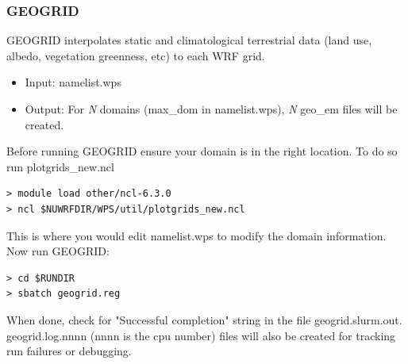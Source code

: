 \begin{frame}[fragile]\frametitle{GEOGRID}

\scriptsize{
GEOGRID interpolates static and climatological terrestrial data (land use, albedo, vegetation greenness, etc) to each WRF grid.
\begin{itemize}
\item Input: namelist.wps
\item Output: For \emph{N} domains (max\_dom in namelist.wps), \emph{N} geo\_em files will be created.
\end{itemize}\scriptsize}    
\hrulefill\par
\scriptsize{Before running GEOGRID ensure your domain is in the right location. To do so run plotgrids\_new.ncl}
\verbatimfont{\scriptsize}%
\begin{verbatim}
> module load other/ncl-6.3.0
> ncl $NUWRFDIR/WPS/util/plotgrids_new.ncl
\end{verbatim}
\scriptsize{This is where you would edit namelist.wps to modify the domain information.
Now run GEOGRID:}
\verbatimfont{\scriptsize}%
\begin{verbatim}
> cd $RUNDIR
> sbatch geogrid.reg
\end{verbatim}
When done, check for  "Successful completion"  string in the file geogrid.slurm.out.
geogrid.log.nnnn (nnnn is the cpu number) files will also be created for tracking run failures or debugging.

\end{frame}

